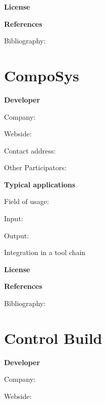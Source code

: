 \documentclass{./template/openetcs_report}
\begin{document}


	\textbf{License}


	\textbf{References}

	Bibliography:


\section{CompoSys}

	\textbf{Developer}

	Company: 

	Webside:

	Contact address:

	Other  Participators:



	\textbf{Typical applications}

	Field of usage:


	Input:

	Output:





	Integration in a tool chain



	\textbf{License}


	\textbf{References}

	Bibliography:


\section{Control Build}

	\textbf{Developer}

	Company: 

	Webside:
\end{document}
